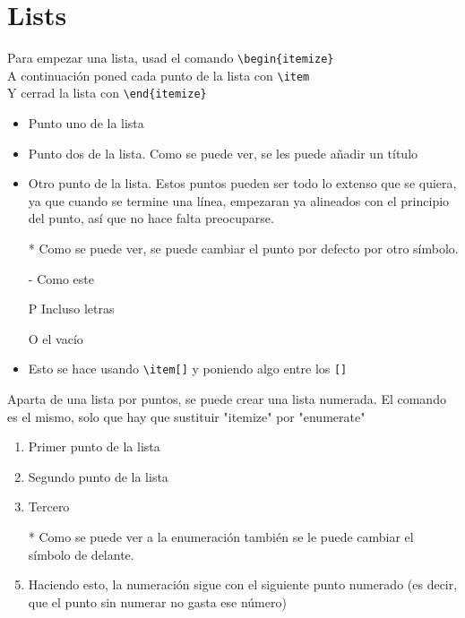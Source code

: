 \chapter{Lists}

Para empezar una lista, usad el comando \verb!\begin{itemize}! \\
A continuación poned cada punto de la lista con \verb!\item! \\
Y cerrad la lista con \verb!\end{itemize}!

\begin{itemize}
	\item Punto uno de la lista
	\item Punto dos de la lista. Como se puede ver, se les puede añadir un título
	\item Otro punto de la lista. Estos puntos pueden ser todo lo extenso que se quiera, ya que cuando se termine una línea, empezaran ya alineados con el principio del punto, así que no hace falta preocuparse.
	\item[*] Como se puede ver, se puede cambiar el punto por defecto por otro símbolo.
	\item[-] Como este
	\item[P] Incluso letras
	\item[] O el vacío
	\item Esto se hace usando \verb!\item[]! y poniendo algo entre los \verb![]!
	
\end{itemize}

Aparta de una lista por puntos, se puede crear una lista numerada. El comando es el mismo, solo que hay que sustituir "itemize" por "enumerate"

\begin{enumerate}
	\item Primer punto de la lista
	\item Segundo punto de la lista
	\item Tercero
	\item[*] Como se puede ver a la enumeración también se le puede cambiar el símbolo de delante.
	\item Haciendo esto, la numeración sigue con el siguiente punto numerado (es decir, que el punto sin numerar no gasta ese número)
\end{enumerate}